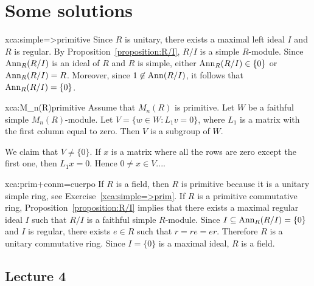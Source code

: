 \chapter*{Some solutions}


\begin{sol}{xca:simple=>primitive}
	Since $R$ is unitary, there exists a maximal left ideal $I$ and $R$ is regular.
	By Proposition~\ref{proposition:R/I}, $R/I$ is a simple $R$-module. 
	Since $\operatorname{Ann}_R(R/I)$ is an ideal of $R$ and $R$ is simple, either $\operatorname{Ann}_R(R/I)\in\{0\}$ or 
	$\operatorname{Ann}_R(R/I)=R$. Moreover, since 
	$1\not\in\operatorname{Ann}(R/I)$, it follows that 
	$\operatorname{Ann}_R(R/I)=\{0\}$. 
\end{sol}

\begin{sol}{xca:M_n(R)primitive}
    Assume that $M_n(R)$ is primitive. Let $W$ be a faithful 
    simple $M_n(R)$-module. Let 
    $V=\{w\in W:L_1v=0\}$, where $L_1$ is a matrix
    with the first column equal to zero. Then $V$ is a subgroup
    of $W$.
    
    We claim that $V\ne\{0\}$. If 
    $x$ is a matrix where all the rows are zero except the first one, 
    then $L_1x=0$. Hence $0\ne x\in V$....
\end{sol}

\begin{sol}{xca:prim+conm=cuerpo}
	If $R$ is a field, then $R$ is primitive because it is a unitary simple ring, see  
	Exercise~\ref{xca:simple=>prim}. If $R$ is a primitive commutative ring, Proposition~\ref{proposition:R/I} implies that there exists a maximal regular ideal $I$
	such that  
	$R/I$ is a faithful simple $R$-module. 
	Since $I\subseteq \operatorname{Ann}_R(R/I)=\{0\}$ and $I$ is regular, there exists $e\in R$ such that 
	$r=re=er$. Therefore $R$ is a unitary commutative ring. Since $I=\{0\}$ is a maximal ideal, 
	$R$ is a field. 
\end{sol}

\section*{Lecture 4}

